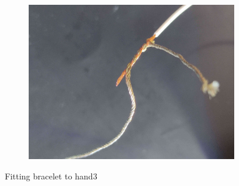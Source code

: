 \documentclass[11pt, a4paper]{article}
\begin{document}
\begin{figure}[h]
\begin{subfigure}[c]{0.33\textwidth}
		\label{fig:Initial_drawing2}
	\end{subfigure}
		\begin{subfigure}[c]{0.31\textwidth}
		\includegraphics[scale=.155]{assets/Connection_thread_wire.jpg}
		\label{fig:Initial_drawing}
	\end{subfigure}
	\caption{Fitting bracelet to hand3}
\end{figure}
\end{document}

